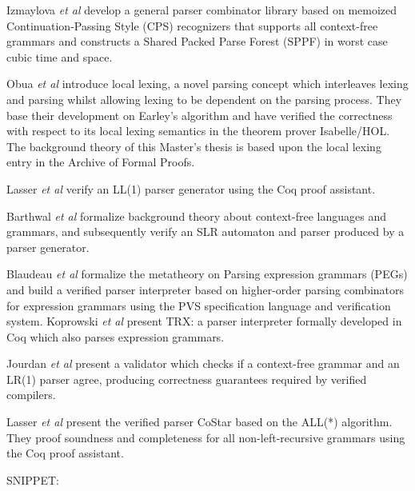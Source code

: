 \begin{isabellebody}
\begin{isamarkuptext}
Izmaylova \textit{et al} \cite{Izmaylova:2016} develop a general parser 
combinator library based on memoized Continuation-Passing Style (CPS) recognizers that supports all
context-free grammars and constructs a Shared Packed Parse Forest (SPPF) in worst case cubic time and space.%
\end{isamarkuptext}\isamarkuptrue%
%
\begin{isamarkuptext}%
Obua \textit{et al} \cite{Obua:2017} introduce local lexing, a novel parsing concept which interleaves
lexing and parsing whilst allowing lexing to be dependent on the parsing process. They base their
development on Earley's algorithm and have verified the correctness with respect to its local lexing
semantics in the theorem prover Isabelle/HOL. The background theory of this Master's thesis is based
upon the local lexing entry \cite{LocalLexing-AFP} in the Archive of Formal Proofs.

Lasser \textit{et al} \cite{Lasser:2019} verify an LL(1) parser generator using the Coq proof assistant.

Barthwal \textit{et al} \cite{Barthwal:2009} formalize background theory
about context-free languages and grammars, and subsequently verify an SLR automaton and parser produced
by a parser generator.

Blaudeau \textit{et al} \cite{Blaudeau:2020} formalize the metatheory on Parsing expression grammars (PEGs) and
build a verified parser interpreter based on higher-order parsing combinators for expression grammars
using the PVS specification language and verification system. Koprowski \textit{et al} \cite{Koprowski:2011}
present TRX: a parser interpreter formally developed in Coq which also parses expression grammars.

Jourdan \textit{et al} \cite{Jourdan:2012} present a validator which checks if a context-free grammar
and an LR(1) parser agree, producing correctness guarantees required by verified compilers.

Lasser \textit{et al} \cite{Lasser:2021} present the verified parser CoStar based on the ALL(*) algorithm.
They proof soundness and completeness for all non-left-recursive grammars using the Coq proof assistant.%
\end{isamarkuptext}\isamarkuptrue%
%
\isadelimdocument
%
\endisadelimdocument
%
\isatagdocument
%
\isamarkuptrue%
%
\isamarkuptrue%
%
\endisatagdocument
{\isafolddocument}%
%
\isadelimdocument
%
\endisadelimdocument
%
\begin{isamarkuptext}%
SNIPPET:


\end{isamarkuptext}
\end{isabellebody}
